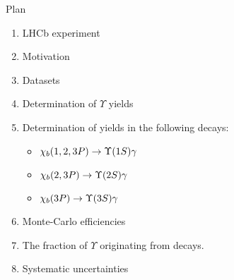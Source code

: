 \begin{frame}{Plan}
\begin{enumerate}
\item LHCb experiment
\item Motivation
\item Datasets
\item Determination of $\Upsilon$ yields
\item Determination of \chib yields in the following decays:
\begin{itemize}
    \item $\chi_b(1,2,3P) \to \OneS \gamma$
    \item $\chi_b(2,3P) \to \TwoS \gamma$
    \item $\chi_b(3P) \to \ThreeS \gamma$
\end{itemize}
\item Monte-Carlo efficiencies
\item The fraction of $\Upsilon$ originating from \chib decays.
\item Systematic uncertainties 
\end{enumerate}
\end{frame}
